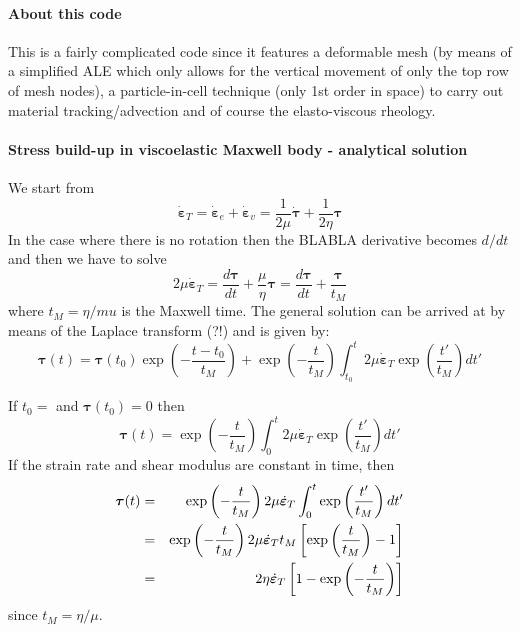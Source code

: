 




\paragraph{About this code}

This is a fairly complicated code since it features a deformable mesh 
(by means of a simplified ALE which only allows for the vertical movement 
of only the top row of mesh nodes), a particle-in-cell technique (only 
1st order in space)
to carry out material tracking/advection and of course the elasto-viscous 
rheology.


\paragraph{Stress build-up in viscoelastic Maxwell body - analytical solution}

We start from 
\[
\dot{\bm \varepsilon}_T = \dot{\bm \varepsilon}_e +\dot{\bm \varepsilon}_v
=\frac{1}{2\mu} \dot{\bm \tau} + \frac{1}{2\eta} {\bm \tau} 
\]
In the case where there is no rotation then the BLABLA derivative becomes $d/dt$
and then 
we have to solve 
\[
2 \mu \dot{\bm \varepsilon}_T 
= \frac{d {\bm \tau}}{dt} + \frac{\mu}{\eta} {\bm \tau}
= \frac{d {\bm \tau}}{dt} + \frac{{\bm \tau}}{t_M}
\]
where $t_M=\eta/mu$ is the Maxwell time. The general solution can be arrived at 
by means of the Laplace transform (?!) and is given by:
\[
{\bm \tau}(t) = {\bm \tau}(t_0) \exp\left( -\frac{t-t_0}{t_M} \right) + \exp \left(-\frac{t}{t_M}\right)
\int_{t_0}^{t} 2 \mu \dot{\bm \varepsilon}_T  \exp \left(\frac{t'}{t_M}\right) dt'
\]

If $t_0=$ and ${\bm \tau}(t_0)=0$ then
\[
{\bm \tau}(t) =  \exp \left(-\frac{t}{t_M}\right)
\int_{0}^{t} 2 \mu \dot{\bm \varepsilon}_T  \exp \left( \frac{t'}{t_M} \right) dt'
\]
If the strain rate and shear modulus are constant in time, then 
\begin{eqnarray}
{\bm \tau}(t) 
&=&  \exp \left(-\frac{t}{t_M}\right)
2 \mu \dot{\bm \varepsilon}_T   \int_{0}^{t} \exp \left( \frac{t'}{t_M} \right) dt' \nonumber\\
&=&  \exp \left(-\frac{t}{t_M}\right)
2 \mu \dot{\bm \varepsilon}_T  t_M  \left[ \exp \left( \frac{t}{t_M} \right) -1  \right] \nonumber\\
&=& 
2 \eta \dot{\bm \varepsilon}_T   \left[ 1 - \exp \left( -\frac{t}{t_M} \right)\right] \nonumber
\end{eqnarray}
since $t_M=\eta/\mu$.

